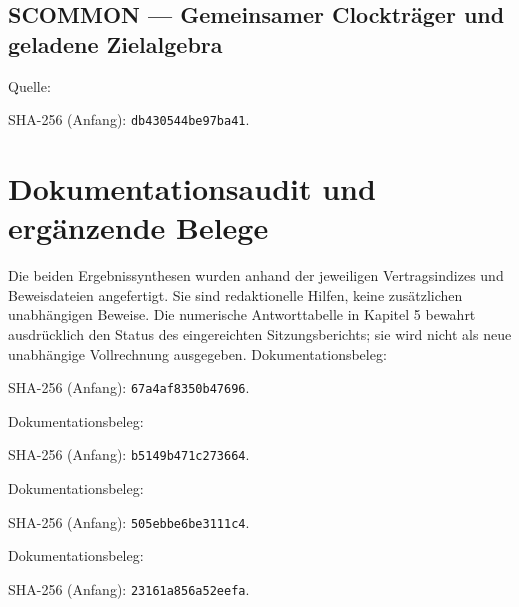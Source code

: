 \subsection*{SCOMMON — Gemeinsamer Clockträger und geladene Zielalgebra}\label{s:COMMON}
Quelle: \par{\footnotesize SHA-256 (Anfang): \texttt{db430544be97ba41}.}\par
\section{Dokumentationsaudit und ergänzende Belege}
Die beiden Ergebnissynthesen wurden anhand der jeweiligen Vertragsindizes und Beweisdateien angefertigt. Sie sind redaktionelle Hilfen, keine zusätzlichen unabhängigen Beweise. Die numerische Antworttabelle in Kapitel 5 bewahrt ausdrücklich den Status des eingereichten Sitzungsberichts; sie wird nicht als neue unabhängige Vollrechnung ausgegeben.
Dokumentationsbeleg: \par{\footnotesize SHA-256 (Anfang): \texttt{67a4af8350b47696}.}\par
Dokumentationsbeleg: \par{\footnotesize SHA-256 (Anfang): \texttt{b5149b471c273664}.}\par
Dokumentationsbeleg: \par{\footnotesize SHA-256 (Anfang): \texttt{505ebbe6be3111c4}.}\par
Dokumentationsbeleg: \par{\footnotesize SHA-256 (Anfang): \texttt{23161a856a52eefa}.}\par

\renewcommand{\bibname}{Wissenschaftlicher Methodenrahmen}


